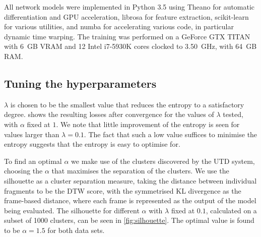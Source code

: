 All network models were implemented in Python 3.5 using Theano \parencite{theano} for automatic differentiation and GPU acceleration, librosa \parencite{librosa} for feature extraction, scikit-learn \parencite{scikit-learn} for various utilities, and numba \parencite{numba} for accelerating various code, in particular dynamic time warping.
The training was performed on a GeForce GTX TITAN with 6~GB VRAM and 12 Intel i7-5930K cores clocked to 3.50~GHz, with 64~GB RAM.

\subsection{Tuning the hyperparameters}
\label{sec:hypersearch}

$\lambda$ is chosen to be the smallest value that reduces the entropy to a satisfactory degree.
 shows the resulting losses after convergence for the values of $\lambda$ tested, with $\alpha$ fixed at $1$.
We note that little improvement of the entropy is seen for values larger than $\lambda = 0.1$.
The fact that such a low value suffices to minimise the entropy suggests that the entropy is easy to optimise for. 

To find an optimal $\alpha$ we make use of the clusters discovered by the UTD system, choosing the $\alpha$ that maximises the separation of the clusters.
We use the silhouette \parencite{rousseeuw1987silhouettes} as a cluster separation measure, taking the distance between individual fragments to be the DTW score, with the symmetrised KL divergence as the frame-based distance, where each frame is represented as the output of the model being evaluated.
The silhouette for different $\alpha$ with $\lambda$ fixed at $0.1$, calculated on a subset of 1000 clusters, can be seen in \cref{fig:silhouette}.
The optimal value is found to be $\alpha = 1.5$ for both data sets.

